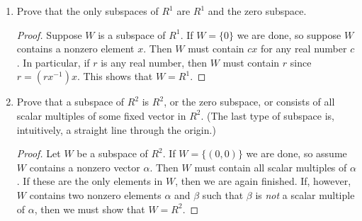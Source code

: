 \begin{enumerate}
\item Prove that the only subspaces of $R^1$ are $R^1$ and the zero
  subspace.
  \begin{proof}
    Suppose $W$ is a subspace of $R^1$. If $W = \{0\}$ we are done, so
    suppose $W$ contains a nonzero element $x$. Then $W$ must contain
    $cx$ for any real number $c$. In particular, if $r$ is any real
    number, then $W$ must contain $r$ since $r = (rx^{-1})x$. This
    shows that $W = R^1$.
  \end{proof}
\item Prove that a subspace of $R^2$ is $R^2$, or the zero subspace,
  or consists of all scalar multiples of some fixed vector in
  $R^2$. (The last type of subspace is, intuitively, a straight line
  through the origin.)
  \begin{proof}
    Let $W$ be a subspace of $R^2$. If $W = \{(0,0)\}$ we are done, so
    assume $W$ contains a nonzero vector $\alpha$. Then $W$ must
    contain all scalar multiples of $\alpha$. If these are the only
    elements in $W$, then we are again finished. If, however, $W$
    contains two nonzero elements $\alpha$ and $\beta$ such that
    $\beta$ is {\em not} a scalar multiple of $\alpha$, then we must
    show that $W = R^2$.


\end{proof}
\end{enumerate}
